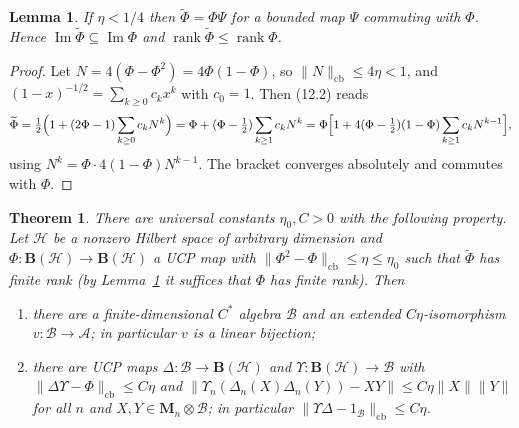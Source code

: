 \documentclass[11pt]{article}
\newtheorem{theorem}{Theorem}
\newtheorem{lemma}[proposition]{Lemma}
\theoremstyle{remark}
\newcommand{\cA}{\mathcal{A}}
\newcommand{\cB}{\mathcal{B}}
\newcommand{\cH}{\mathcal{H}}
\newcommand{\Bo}{\mathbf{B}}
\newcommand{\cb}{\mathrm{cb}}
\newcommand{\Img}{\operatorname{Im}}
\newcommand{\wt}{\widetilde}
\newcommand{\Ma}[1]{\mathbf{M}_{#1}}
\begin{document}
\begin{lemma}\label{lem:rank}
If $\eta<1/4$ then $\wt\Phi=\Phi\Psi$ for a bounded map $\Psi$ commuting with $\Phi$. Hence $\Img\wt\Phi\subseteq\Img\Phi$ and $\operatorname{rank}\wt\Phi\le\operatorname{rank}\Phi$.
\end{lemma}

\begin{proof}
Let $N=4(\Phi-\Phi^2)=4\Phi(1-\Phi)$, so $\|N\|_\cb\le 4\eta<1$, and $(1-x)^{-1/2}=\sum_{k\ge0}c_kx^k$ with $c_0=1$. Then (12.2) reads
\[
\wt\Phi=\tfrac12\Bigl(1+(2\Phi-1)\sum_{k\ge0}c_kN^k\Bigr)
=\Phi+(\Phi-\tfrac12)\sum_{k\ge1}c_kN^k
=\Phi\Bigl[1+4(\Phi-\tfrac12)(1-\Phi)\sum_{k\ge1}c_kN^{k-1}\Bigr],
\]
using $N^k=\Phi\cdot4(1-\Phi)N^{k-1}$. The bracket converges absolutely and commutes with $\Phi$.
\end{proof}

\begin{theorem}\label{thm:A}
There are universal constants $\eta_0,C>0$ with the following property. Let $\cH$ be a nonzero Hilbert space of arbitrary dimension and $\Phi\colon\Bo(\cH)\to\Bo(\cH)$ a UCP map with $\|\Phi^2-\Phi\|_\cb\le\eta\le\eta_0$ such that $\wt\Phi$ has finite rank (by Lemma~\ref{lem:rank} it suffices that $\Phi$ has finite rank). Then
\begin{enumerate}
\item[(i)] there are a finite-dimensional $C^*$ algebra $\cB$ and an extended $C\eta$-isomorphism $v\colon\cB\to\cA$; in particular $v$ is a linear bijection;
\item[(ii)] there are UCP maps $\Delta\colon\cB\to\Bo(\cH)$ and $\Upsilon\colon\Bo(\cH)\to\cB$ with $\|\Delta\Upsilon-\Phi\|_\cb\le C\eta$ and $\|\Upsilon_n(\Delta_n(X)\Delta_n(Y))-XY\|\le C\eta\|X\|\|Y\|$ for all $n$ and $X,Y\in\Ma{n}\otimes\cB$; in particular $\|\Upsilon\Delta-1_\cB\|_\cb\le C\eta$.
\end{enumerate}
\end{theorem}
\end{document}
